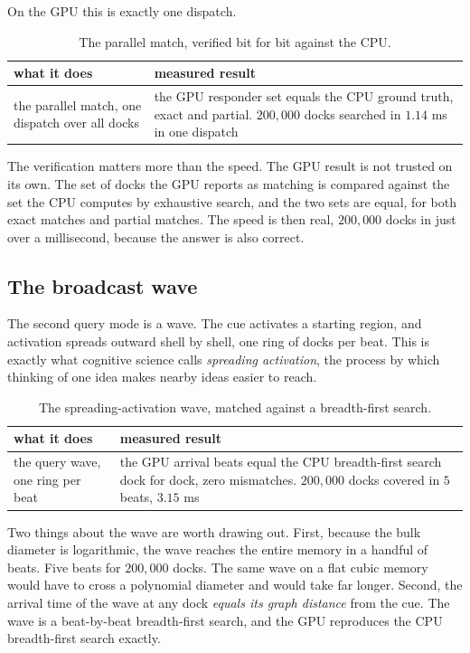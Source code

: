 On the GPU this is exactly one dispatch.

\begin{table}[ht]
\centering
\begin{tabular}{@{}p{}p{}@{}}
\toprule
what it does & measured result \\
\midrule
the parallel match, one dispatch over all docks & the GPU responder set equals the CPU ground truth, exact and partial. $200{,}000$ docks searched in $1.14$ ms in one dispatch \\
\bottomrule
\end{tabular}
\caption{The parallel match, verified bit for bit against the CPU.}
\label{tab:parallel-match}
\end{table}

The verification matters more than the speed. The GPU result is not trusted on its own. The set of docks the GPU reports as matching is compared against the set the CPU computes by exhaustive search, and the two sets are equal, for both exact matches and partial matches. The speed is then real, $200{,}000$ docks in just over a millisecond, because the answer is also correct.

\subsection{The broadcast wave}

The second query mode is a wave. The cue activates a starting region, and activation spreads outward shell by shell, one ring of docks per beat. This is exactly what cognitive science calls \emph{spreading activation}, the process by which thinking of one idea makes nearby ideas easier to reach.

\begin{table}[ht]
\centering
\begin{tabular}{@{}p{}p{}@{}}
\toprule
what it does & measured result \\
\midrule
the query wave, one ring per beat & the GPU arrival beats equal the CPU breadth-first search dock for dock, zero mismatches. $200{,}000$ docks covered in $5$ beats, $3.15$ ms \\
\bottomrule
\end{tabular}
\caption{The spreading-activation wave, matched against a breadth-first search.}
\label{tab:wave}
\end{table}

Two things about the wave are worth drawing out. First, because the bulk diameter is logarithmic, the wave reaches the entire memory in a handful of beats. Five beats for $200{,}000$ docks. The same wave on a flat cubic memory would have to cross a polynomial diameter and would take far longer. Second, the arrival time of the wave at any dock \emph{equals its graph distance} from the cue. The wave is a beat-by-beat breadth-first search, and the GPU reproduces the CPU breadth-first search exactly.

